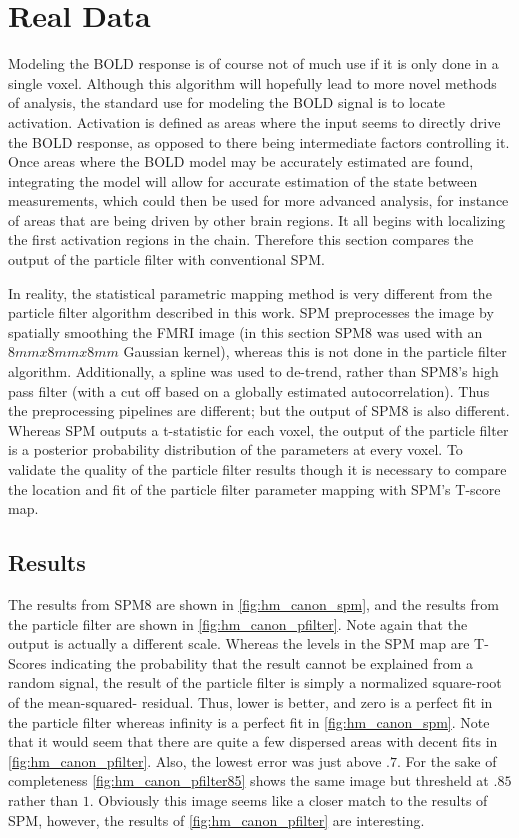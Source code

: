 \chapter{Real Data}
\label{sec:RealData}
Modeling the BOLD response is of course not of much use if it is only done in a 
single voxel. Although this algorithm will hopefully lead to more novel methods 
of analysis, the standard use for modeling the BOLD signal is to locate activation.
Activation is defined as areas where the input seems to directly drive
the BOLD response, as opposed to there being intermediate factors controlling it. 
Once areas where the BOLD 
model may be accurately estimated are found, integrating the model will allow for accurate
estimation of the state between measurements, which could then be used for more 
advanced analysis, for instance of areas that are being driven by other brain regions.
It all begins with localizing the first activation regions in the
chain. Therefore this section compares the output of the particle filter 
with conventional SPM. 

In reality, the statistical parametric mapping method is very different from the 
particle filter algorithm described in this work.
SPM preprocesses the image by spatially smoothing the FMRI image (in this section 
SPM8 was used with an $8mm x 8mm x 8mm$ Gaussian kernel), whereas
this is not done in the particle filter algorithm. Additionally, a spline
was used to de-trend, rather than SPM8's high pass filter (with a cut
off based on a globally estimated autocorrelation). Thus the preprocessing pipelines 
are different; but the output of SPM8 is also different. Whereas SPM outputs
a t-statistic for each voxel, the output 
of the particle filter is a posterior probability distribution of the parameters
at every voxel. To validate the quality of the particle filter results though
it is necessary to compare the location and fit of the particle filter parameter
mapping with SPM's T-score map. 

\section{Results}

The results from SPM8 are shown in \autoref{fig:hm_canon_spm}, and the results from 
the particle filter are shown in \autoref{fig:hm_canon_pfilter}. Note again that the
output is actually a different scale. Whereas the levels in the SPM map are T-Scores
indicating the probability that the result cannot be explained from a random signal,
the result of the particle filter is simply a normalized square-root of the mean-squared-
residual. Thus, lower is better, and zero is a perfect fit in the particle filter whereas
infinity is a perfect fit in \autoref{fig:hm_canon_spm}. Note that it would seem that there
are quite a few dispersed areas with decent fits in \autoref{fig:hm_canon_pfilter}. Also,
the lowest error was just above $.7$. 
For the sake of completeness \autoref{fig:hm_canon_pfilter85} shows the same image but
thresheld at $.85$ rather than $1$. Obviously this image seems like a closer match to
the results of SPM, however, the results of \autoref{fig:hm_canon_pfilter} are interesting.

